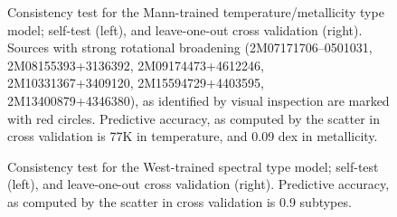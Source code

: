 \documentclass[modern]{aastex62}
\begin{document}
\newpage

\begin{figure}[ht]
\caption{Consistency test for the Mann-trained temperature/metallicity type model; self-test (left), and leave-one-out cross validation (right). Sources with strong rotational broadening (2M07171706--0501031, 2M08155393+3136392, 2M09174473+4612246, 2M10331367+3409120, 2M15594729+4403595, 2M13400879+4346380), as identified by visual inspection are marked with red circles. Predictive accuracy, as computed by the scatter in cross validation is 77K in temperature, and 0.09 dex in metallicity.}\label{fig:mann_validation}
\end{figure}

\begin{figure}[ht]
\begin{center}
\end{center}
\caption{Consistency test for the West-trained spectral type model; self-test (left), and leave-one-out cross validation (right).  Predictive accuracy, as computed by the scatter in cross validation is 0.9 subtypes.}\label{fig:west_validation}
\end{figure}
\end{document}
